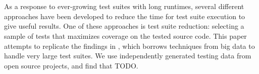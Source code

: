 \chapter{\abstractname}

As a response to ever-growing test suites with long runtimes, several
different approaches have been developed to reduce the time for test
suite execution to give useful results. One of these approaches is test
suite reduction: selecting a sample of tests that maximizes coverage on
the tested source code. This paper attempts to replicate the findings
in \cite{cruciani2019scalable}, which borrows techniques from big
data to handle very large test suites. We use independently generated
testing data from open source projects, and find that TODO.
